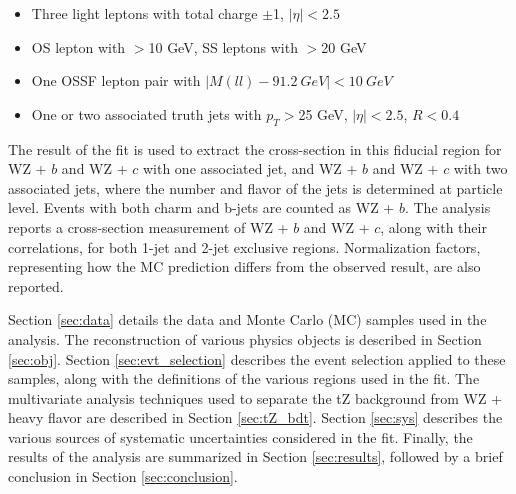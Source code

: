 \begin{itemize}
\item Three light leptons with total charge $\pm$1, $|\eta| < 2.5$
\item OS lepton with \pt$>$10 GeV, SS leptons with \pt$>$20 GeV
\item One OSSF lepton pair with $|M(ll)-91.2\ GeV| < 10\ GeV$
\item One or two associated truth jets with $p_T >$25 GeV, $|\eta| < 2.5$, $R<0.4$
\end{itemize}

The result of the fit is used to extract the cross-section in this fiducial region for WZ + $b$ and WZ + $c$ with one associated jet, and WZ + $b$ and WZ + $c$ with two associated jets, where the number and flavor of the jets is determined at particle level. Events with both charm and b-jets are counted as WZ + $b$. The analysis reports a cross-section measurement of WZ + $b$ and WZ + $c$, along with their correlations, for both 1-jet and 2-jet exclusive regions. Normalization factors, representing how the MC prediction differs from the observed result, are also reported.

Section \ref{sec:data} details the data and Monte Carlo (MC) samples used in the analysis. The reconstruction of various physics objects is described in Section \ref{sec:obj}. Section \ref{sec:evt_selection} describes the event selection applied to these samples, along with the definitions of the various regions used in the fit. The multivariate analysis techniques used to separate the tZ background from WZ + heavy flavor are described in Section \ref{sec:tZ_bdt}. Section \ref{sec:sys} describes the various sources of systematic uncertainties considered in the fit. Finally, the results of the analysis are summarized in Section \ref{sec:results}, followed by a brief conclusion in Section \ref{sec:conclusion}.


